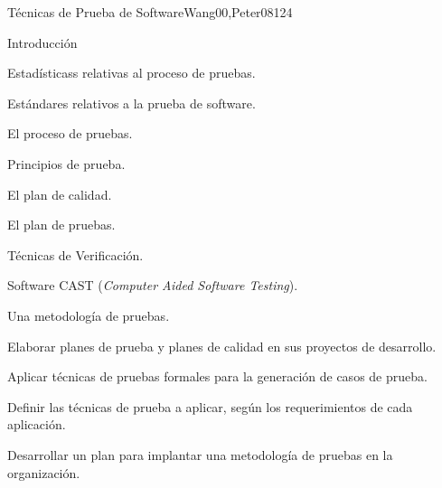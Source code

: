 \begin{syllabus}
\begin{unit}{Técnicas de Prueba de Software}{Wang00,Peter08}{12}{4}
\begin{topics}
      \item Introducción
      \item Estadísticass relativas al proceso de pruebas.
      \item Estándares relativos a la prueba de software.
      \item El proceso de pruebas.
      \begin{inparaenum}
         \item Principios de prueba.
         \item El plan de calidad.
         \item El plan de pruebas.
         \item Técnicas de Verificación.
      \end{inparaenum}
      \item Software CAST (\textit{Computer Aided Software Testing}).
      \item Una metodología de pruebas.
   \end{topics}

   \begin{unitgoals}
      \item Elaborar planes de prueba y planes de calidad en sus proyectos de desarrollo.
      \item Aplicar técnicas de pruebas formales para la generación de casos de prueba.
      \item Definir las técnicas de prueba a aplicar, según los requerimientos de cada aplicación.
      \item Desarrollar un plan para implantar una metodología de pruebas en la organización.
   \end{unitgoals}
\end{unit}



\begin{coursebibliography}
\end{coursebibliography}

\end{syllabus}
